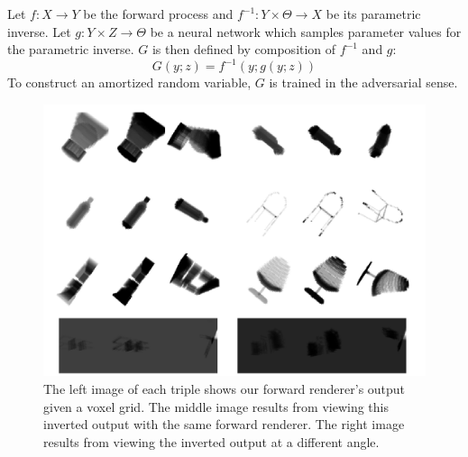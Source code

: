 \documentclass{sciposter}
\theoremstyle{definition} %
\begin{document}
\begin{multicols}{3}
Let $f: X \to Y$ be the forward process and $f^{-1}: Y \times \Theta \to X$ be its parametric inverse.  Let $g : Y \times Z \to \Theta$ be a neural network which samples parameter values for the parametric inverse.
$G$ is then defined by composition of $f^{-1}$ and $g$:
\begin{equation}
G(y; z) = f^{-1}(y; g(y; z))
\end{equation}
To construct an amortized random variable, $G$ is trained in the adversarial sense.

\begin{figure}
\includegraphics[width=1.0\textwidth]{inv3.png}
\caption{The left image of each triple shows our forward renderer's output given a voxel grid. The middle image results from viewing this inverted output with the same forward renderer. The right image results from viewing the inverted output at a different angle.}\label{inv_renderer}
\end{figure}



\end{multicols}
\end{document}
